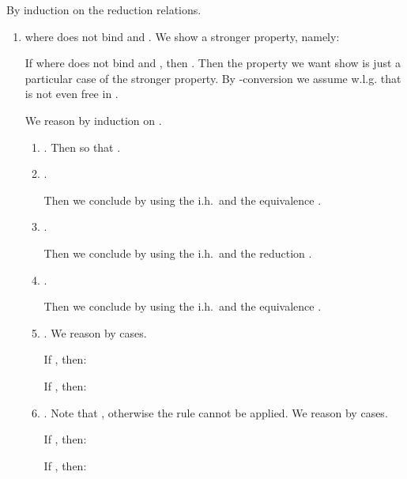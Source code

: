 \documentclass{LMCS}
\renewcommand{\>}{\rightarrow}
\newcommand{\ih}{i.h.}
\newcommand{\ignore}[1]{}
\begin{document}
\proof
By induction on the reduction relations. 
\begin{enumerate}[]
\item   where  does not
  bind   and .  We show a stronger property, namely: 

 If   where  does not
  bind  and , then .   
Then the property we want show is just a particular case of the stronger property. By -conversion
  we assume w.l.g. 
  that
   is not even free in .

We reason by induction on .
  \begin{enumerate}[]
    \item . Then  so that . 
    \item .  
       \ignore{We have .

        If , then: 
         
      
        If , then: 
          
      }
       Then we conclude by using the \ih\ and the
        equivalence . 
      
      \item .  
        \ignore{We have 
        . 

        If , then: 
          
      
        If , then: 
       
        }
        Then we conclude by using the \ih\ and the
        reduction  . 
        
  \item .  
        \ignore{We have .

        If , then: 
        .
      
        If , then .
        }
        Then we conclude by using the \ih\ and the
        equivalence . 
        
\item  . 
        We reason by cases. 


        If , then:
         

If , then:
         
        

\ignore{        
Now suppose .  Again we reason by cases. 

If , then:
         

If , then:
         
}
\item  .  Note that , otherwise the rule cannot be applied.         We reason by cases. 


        If , then:
         

If , then:
         

\end{enumerate}
\end{enumerate}
\end{document}
